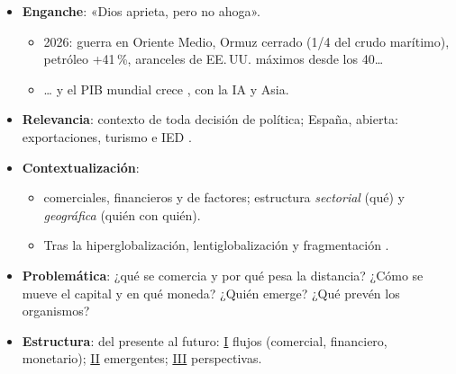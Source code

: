 \documentclass{article}
\begin{document}
\cabecerarepaso
\begin{columnas}

\begin{itemize}
\item \textbf{Enganche}: «Dios aprieta, pero no ahoga».
  \begin{itemize}
  \item 2026: guerra en Oriente Medio, Ormuz cerrado (1/4 del crudo marítimo), petróleo +41\,\%, aranceles de EE.\,UU. máximos desde los 40…
  \item … y el PIB mundial crece , con la IA y Asia.
  \end{itemize}
\item \textbf{Relevancia}: contexto de toda decisión de política; España, abierta: exportaciones, turismo e IED  .
\item \textbf{Contextualización}:
  \begin{itemize}
  \item {} comerciales, financieros  y de factores; estructura \emph{sectorial} (qué) y \emph{geográfica} (quién con quién).
  \item Tras la hiperglobalización, lentiglobalización y fragmentación .
  \end{itemize}
\item \textbf{Problemática}: ¿qué se comercia y por qué pesa la distancia? ¿Cómo se mueve el capital y en qué moneda? ¿Quién emerge? ¿Qué prevén los organismos?
\item \textbf{Estructura}: del presente al futuro: \hyperref[rep:I]{I} flujos (comercial, financiero, monetario); \hyperref[rep:II]{II} emergentes; \hyperref[rep:III]{III} perspectivas.
\end{itemize}


\end{columnas}
\end{document}
